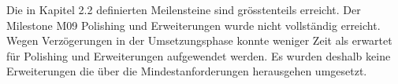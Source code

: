 Die in Kapitel 2.2 definierten Meilensteine sind grösstenteils erreicht.
Der Milestone M09 Polishing und Erweiterungen wurde nicht vollständig erreicht.
Wegen Verzögerungen in der Umsetzungsphase konnte weniger Zeit als erwartet für Polishing und Erweiterungen aufgewendet werden.
Es wurden deshalb keine Erweiterungen die über die Mindestanforderungen herausgehen umgesetzt.

\clearpage
